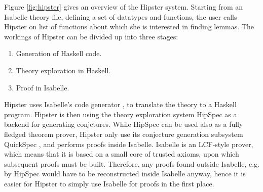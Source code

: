 \label{sec:background}

Figure \ref{fig:hipster} gives an overview of the Hipster system. Starting from an Isabelle theory file, defining a set of datatypes and functions, the user calls Hipster on list of functions about which she is interested in finding lemmas. The workings of Hipster can be divided up into three stages:
\begin{enumerate}
\item Generation of Haskell code. 
\item Theory exploration in Haskell.
\item Proof in Isabelle.
\end{enumerate}
Hipster uses Isabelle's code generator \cite{codegen}, to translate the theory to a Haskell program. Hipster is then using the theory exploration system HipSpec as a backend for generating conjctures. While HipSpec can be used also as a fully fledged theorem prover, Hipster only use its conjecture generation subsystem QuickSpec \cite{quickspec}, and performs proofs inside Isabelle. Isabelle is an LCF-style prover, which means that it is based on a small core of trusted axioms, upon which subsequent proofs must be built. Therefore, any proofs found outside Isabelle, e.g. by HipSpec would have to be reconstructed inside Isabelle anyway, hence it is easier for Hipster to simply use Isabelle for proofs in the first place. 
